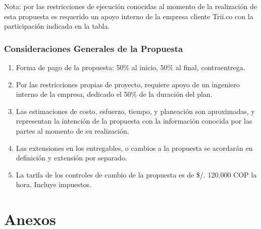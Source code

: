 \documentclass[
  paper=a4,
  ,captions=tableheading
]{scrartcl}
\providecommand{\tightlist}{%
  \setlength{\itemsep}{0pt}\setlength{\parskip}{0pt}}
\begin{document}
Nota: por las restricciones de ejecución conocidas al momento de la
realización de esta propuesta es requerido un apoyo interno de la
empresa cliente Trii.co con la participación indicada en la tabla.

\subsubsection{Consideraciones Generales de la
Propuesta}\label{sec:consideraciones-generales-de-la-propuesta}

\begin{enumerate}
\def\labelenumi{\arabic{enumi}.}
\tightlist
\item
  Forma de pago de la propuesta: 50\% al inicio, 50\% al final,
  contraentrega.
\item
  Por las restricciones propias de proyecto, requiere apoyo de un
  ingeniero interno de la empresa, dedicado el 50\% de la duración del
  plan.
\item
  Las estimaciones de costo, esfuerzo, tiempo, y planeación son
  aproximadas, y representan la intención de la propuesta con la
  información conocida por las partes al momento de su realización.
\item
  Las extensiones en los entregables, o cambios a la propuesta se
  acordarán en definición y extensión por separado.
\item
  La tarifa de los controles de cambio de la propuesta es de \$/.
  120.000 COP la hora. Incluye impuestos.
\end{enumerate}

\newpage

\section{Anexos}\label{sec:anexos}
\end{document}
